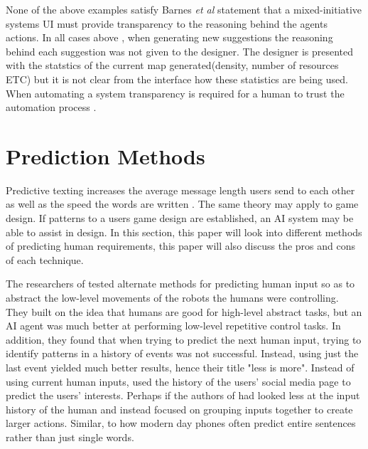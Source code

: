 \documentclass[journal]{IEEEtran}
\begin{document}
None of the above examples \cite{alvarez2018fostering, liapis2013sentient, baldwin2017mixed} satisfy  Barnes \textit{et al}\cite{barnes2015designing} statement that a mixed-initiative systems UI must provide transparency to the reasoning behind the agents actions. In all cases above\cite{alvarez2018fostering, liapis2013sentient, baldwin2017mixed} , when generating new suggestions the reasoning behind each suggestion was not given to the designer. The designer is presented with the statstics of the current map generated(density, number of resources ETC) but it is not clear from the interface how these statistics are being used. When automating a system transparency is required for a human to trust the automation process \cite{lee2004trust}.

\section{Prediction Methods} \label{prediction}
Predictive texting increases the average message length users send to each other \cite{ling2005length} as well as the speed the words are written \cite{dunlop2000predictive}. The same theory may apply to game design. If patterns to a users game design are established, an AI system may be able to assist in design. In this section, this paper will look into different methods of predicting human requirements, this paper will also discuss the pros and cons of each technique.

The researchers of \cite{chipalkatty2013less} tested alternate methods for predicting human input so as to abstract the low-level movements of the robots the humans were controlling. They built on the idea that humans are good for high-level abstract tasks, but an AI agent was much better at performing low-level repetitive control tasks. In addition, they found that when trying to predict the next human input, trying to identify patterns in a history of events was not successful. Instead, using just the last event yielded much better results, hence their title "less is more". Instead of using current human inputs, \cite{bhatia2016targeted} used the history of the users' social media page to predict the users' interests. Perhaps if the authors of \cite{chipalkatty2013less} had looked less at the input history of the human and instead focused on grouping inputs together to create larger actions. Similar, to how modern day phones often predict entire sentences rather than just single words.
\end{document}
